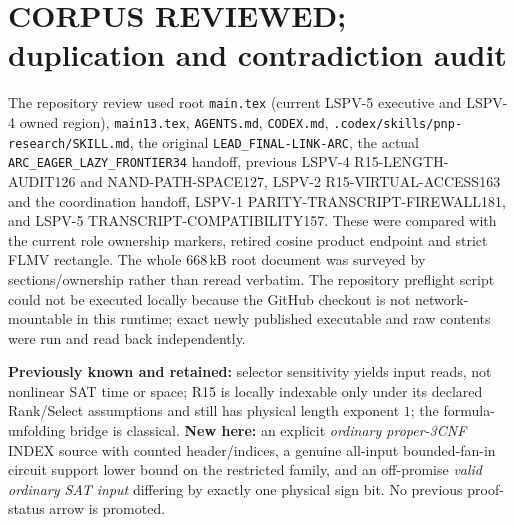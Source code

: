 \documentclass[11pt]{article}
\begin{document}
\section{CORPUS REVIEWED; duplication and contradiction audit}
The repository review used root \texttt{main.tex} (current LSPV-5 executive and LSPV-4 owned region), \texttt{main13.tex}, \texttt{AGENTS.md}, \texttt{CODEX.md}, \texttt{.codex/skills/pnp-research/SKILL.md}, the original \texttt{LEAD\_FINAL-LINK-ARC}, the actual \texttt{ARC\_EAGER\_LAZY\_FRONTIER34} handoff, previous LSPV-4 R15-LENGTH-AUDIT126 and NAND-PATH-SPACE127, LSPV-2 R15-VIRTUAL-ACCESS163 and the coordination handoff, LSPV-1 PARITY-TRANSCRIPT-FIREWALL181, and LSPV-5 TRANSCRIPT-COMPATIBILITY157. These were compared with the current role ownership markers, retired cosine product endpoint and strict FLMV rectangle. The whole $668$\,kB root document was surveyed by sections/ownership rather than reread verbatim. The repository preflight script could not be executed locally because the GitHub checkout is not network-mountable in this runtime; exact newly published executable and raw contents were run and read back independently.

\textbf{Previously known and retained:} selector sensitivity yields input reads, not nonlinear SAT time or space; R15 is locally indexable only under its declared Rank/Select assumptions and still has physical length exponent $1$; the formula-unfolding bridge is classical. \textbf{New here:} an explicit \emph{ordinary proper-3CNF} INDEX source with counted header/indices, a genuine all-input bounded-fan-in circuit support lower bound on the restricted family, and an off-promise \emph{valid ordinary SAT input} differing by exactly one physical sign bit. No previous proof-status arrow is promoted.
\end{document}
